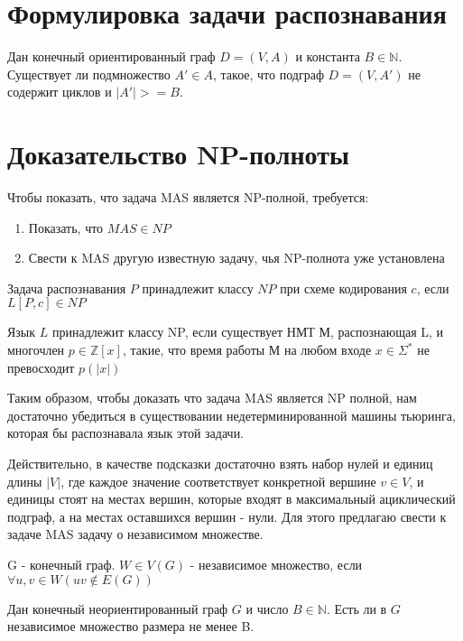 
\section{Формулировка задачи распознавания} 

\begin{problem}
    Дан конечный ориентированный граф $D = (V, A)$ и константа 
    $B \in \mathbb{N}$. Существует ли подмножество $A' \in A$, такое, что
    подграф $D = (V, A')$ не содержит циклов и $|A'| >= B$. 
\end{problem}

\section{Доказательство NP-полноты} 

Чтобы показать, что задача MAS является NP-полной, требуется:

\begin{enumerate}
    \setlength{\itemindent}{1em}
    \item Показать, что $MAS \in NP$ \\
    \item Свести к MAS другую известную задачу, чья NP-полнота уже установлена 
\end{enumerate}

\begin{definition}
    Задача распознавания $P$ принадлежит классу $NP$ при схеме
    кодирования $c$, если $L\left[P, c\right] \in NP$
\end{definition}
\begin{definition}
    Язык $L$ принадлежит классу NP, если существует НМТ М, распознающая
    L, и многочлен $p \in \mathbb{Z}[x]$, такие, что время работы М
    на любом входе $x \in \Sigma^*$ не превосходит $p(|x|)$
\end{definition}
Таким образом, чтобы доказать что задача MAS является NP полной, нам 
достаточно убедиться в существовании недетерминированной машины 
тьюринга, которая бы распознавала язык этой задачи.

Действительно, в качестве подсказки достаточно взять набор нулей 
и единиц длины $|V|$, где каждое значение соответствует конкретной 
вершине $v \in V$, и единицы стоят на местах вершин, которые входят 
в максимальный ациклический подграф, а на местах оставшихся вершин - 
нули.
Для этого предлагаю свести к задаче MAS задачу о независимом множестве.
\begin{definition}
    G - конечный граф. $W \in V(G)$ - независимое множество, если \\
    $\forall u,v \in W (uv \notin E(G))$
\end{definition}
\begin{problem}
    Дан конечный неориентированный граф $G$ и число $B \in \mathbb{N}$.
    Есть ли в $G$ независимое множество размера не менее B.
\end{problem}

